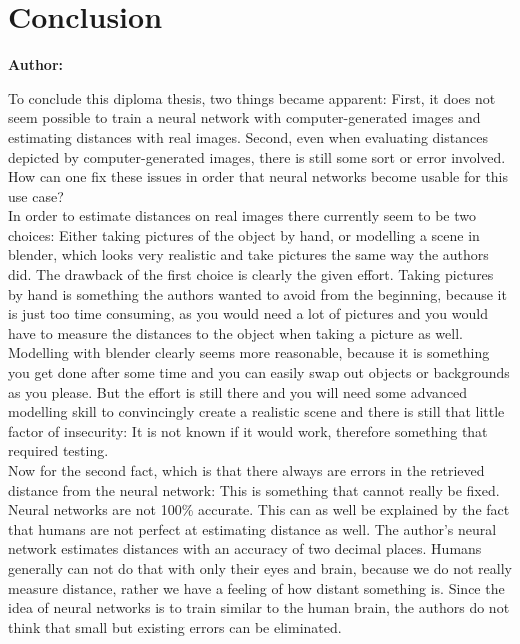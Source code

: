 \chapter{Conclusion}

\textbf{Author: } 

To conclude this diploma thesis, two things became apparent: First, it does not seem possible to train a neural network with computer-generated images and estimating distances with real images. Second, even when evaluating distances depicted by computer-generated images, there is still some sort or error involved. How can one fix these issues in order that neural networks become usable for this use case?\\
In order to estimate distances on real images there currently seem to be two choices: Either taking pictures of the object by hand, or modelling a scene in blender, which looks very realistic and take pictures the same way the authors did. The drawback of the first choice is clearly the given effort. Taking pictures by hand is something the authors wanted to avoid from the beginning, because it is just too time consuming, as you would need a lot of pictures and you would have to measure the distances to the object when taking a picture as well. Modelling with blender clearly seems more reasonable, because it is something you get done after some time and you can easily swap out objects or backgrounds as you please. But the effort is still there and you will need some advanced modelling skill to convincingly create a realistic scene and there is still that little factor of insecurity: It is not known if it would work, therefore something that required testing.\\
Now for the second fact, which is that there always are errors in the retrieved distance from the neural network: This is something that cannot really be fixed. Neural networks are not 100\% accurate. This can as well be explained by the fact that humans are not perfect at estimating distance as well. The author's neural network estimates distances with an accuracy of two decimal places. Humans generally can not do that with only their eyes and brain, because we do not really measure distance, rather we have a feeling of how distant something is. Since the idea of neural networks is to train similar to the human brain, the authors do not think that small but existing errors can be eliminated. 




\filbreak